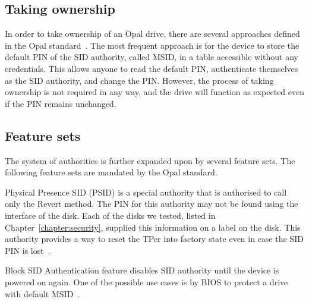 \subsection{Taking ownership}


In order to take ownership of an Opal drive, there are several approaches defined in the Opal standard~\cite{tcg-opal2}. The most frequent approach is for the device to store the default PIN of the SID authority, called MSID, in a table accessible without any credentials. This allows anyone to read the default PIN, authenticate themselves as the SID authority, and change the PIN. However, the process of taking ownership is not required in any way, and the drive will function as expected even if the PIN remains unchanged.



\subsection{Feature sets}

The system of authorities is further expanded upon by several feature sets.
The following feature sets are mandated by the Opal standard.

Physical Presence SID (PSID) is a special authority that is authorised to call only the Revert method. The PIN for this authority may not be found using the interface of the disk. 
Each of the disks we tested, listed in Chapter~\ref{chapter:security}, supplied this information on a label on the disk. This authority provides a way to reset the TPer into factory state even in case the SID PIN is lost~\cite{tcg-psid}.

Block SID Authentication feature disables SID authority until the device is powered on again. One of the possible use cases is by BIOS to protect a drive with default MSID~\cite{tcg-block-sid-auth}.


